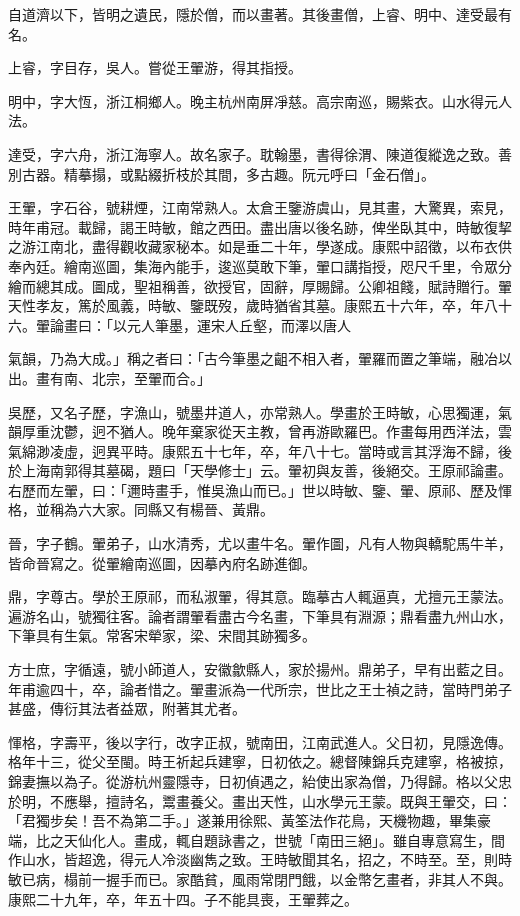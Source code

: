 \begin{pinyinscope}
自道濟以下，皆明之遺民，隱於僧，而以畫著。其後畫僧，上睿、明中、達受最有名。

上睿，字目存，吳人。嘗從王翬游，得其指授。

明中，字大恆，浙江桐鄉人。晚主杭州南屏凈慈。高宗南巡，賜紫衣。山水得元人法。

達受，字六舟，浙江海寧人。故名家子。耽翰墨，書得徐渭、陳道復縱逸之致。善別古器。精摹搨，或點綴折枝於其間，多古趣。阮元呼曰「金石僧」。

王翬，字石谷，號耕煙，江南常熟人。太倉王鑒游虞山，見其畫，大驚異，索見，時年甫冠。載歸，謁王時敏，館之西田。盡出唐以後名跡，俾坐臥其中，時敏復挈之游江南北，盡得觀收藏家秘本。如是垂二十年，學遂成。康熙中詔徵，以布衣供奉內廷。繪南巡圖，集海內能手，逡巡莫敢下筆，翬口講指授，咫尺千里，令眾分繪而總其成。圖成，聖祖稱善，欲授官，固辭，厚賜歸。公卿祖餞，賦詩贈行。翬天性孝友，篤於風義，時敏、鑒既歿，歲時猶省其墓。康熙五十六年，卒，年八十六。翬論畫曰：「以元人筆墨，運宋人丘壑，而澤以唐人

氣韻，乃為大成。」稱之者曰：「古今筆墨之齟不相入者，翬羅而置之筆端，融冶以出。畫有南、北宗，至翬而合。」

吳歷，又名子歷，字漁山，號墨井道人，亦常熟人。學畫於王時敏，心思獨運，氣韻厚重沈鬱，迥不猶人。晚年棄家從天主教，曾再游歐羅巴。作畫每用西洋法，雲氣綿渺凌虛，迥異平時。康熙五十七年，卒，年八十七。當時或言其浮海不歸，後於上海南郭得其墓碣，題曰「天學修士」云。翬初與友善，後絕交。王原祁論畫。右歷而左翬，曰：「邇時畫手，惟吳漁山而已。」世以時敏、鑒、翬、原祁、歷及惲格，並稱為六大家。同縣又有楊晉、黃鼎。

晉，字子鶴。翬弟子，山水清秀，尤以畫牛名。翬作圖，凡有人物與轎駝馬牛羊，皆命晉寫之。從翬繪南巡圖，因摹內府名跡進御。

鼎，字尊古。學於王原祁，而私淑翬，得其意。臨摹古人輒逼真，尤擅元王蒙法。遍游名山，號獨往客。論者謂翬看盡古今名畫，下筆具有淵源；鼎看盡九州山水，下筆具有生氣。常客宋犖家，梁、宋間其跡獨多。

方士庶，字循遠，號小師道人，安徽歙縣人，家於揚州。鼎弟子，早有出藍之目。年甫逾四十，卒，論者惜之。翬畫派為一代所宗，世比之王士禎之詩，當時門弟子甚盛，傳衍其法者益眾，附著其尤者。

惲格，字壽平，後以字行，改字正叔，號南田，江南武進人。父日初，見隱逸傳。格年十三，從父至閩。時王祈起兵建寧，日初依之。總督陳錦兵克建寧，格被掠，錦妻撫以為子。從游杭州靈隱寺，日初偵遇之，紿使出家為僧，乃得歸。格以父忠於明，不應舉，擅詩名，鬻畫養父。畫出天性，山水學元王蒙。既與王翬交，曰：「君獨步矣！吾不為第二手。」遂兼用徐熙、黃筌法作花鳥，天機物趣，畢集豪端，比之天仙化人。畫成，輒自題詠書之，世號「南田三絕」。雖自專意寫生，間作山水，皆超逸，得元人冷淡幽雋之致。王時敏聞其名，招之，不時至。至，則時敏已病，榻前一握手而已。家酷貧，風雨常閉門餓，以金幣乞畫者，非其人不與。康熙二十九年，卒，年五十四。子不能具喪，王翬葬之。


\end{pinyinscope}
